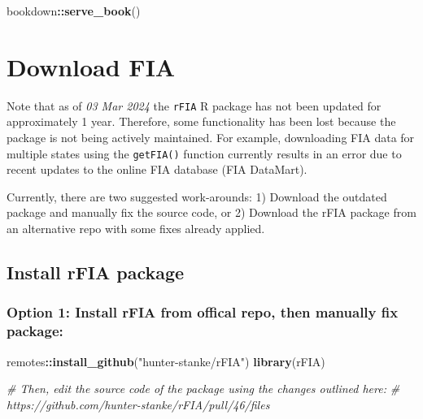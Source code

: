 \documentclass[
]{book}
\newenvironment{Shaded}{\begin{snugshade}}{\end{snugshade}}
\newcommand{\CommentTok}[1]{\textcolor[rgb]{0.56,0.35,0.01}{\textit{#1}}}
\newcommand{\FunctionTok}[1]{\textcolor[rgb]{0.13,0.29,0.53}{\textbf{#1}}}
\newcommand{\NormalTok}[1]{#1}
\newcommand{\SpecialCharTok}[1]{\textcolor[rgb]{0.81,0.36,0.00}{\textbf{#1}}}
\newcommand{\StringTok}[1]{\textcolor[rgb]{0.31,0.60,0.02}{#1}}
\begin{document}
\begin{Shaded}
\begin{Highlighting}[]
\NormalTok{bookdown}\SpecialCharTok{::}\FunctionTok{serve\_book}\NormalTok{()}
\end{Highlighting}
\end{Shaded}

\hypertarget{download}{%
\chapter{Download FIA}\label{download}}

Note that as of \emph{03 Mar 2024} the \texttt{rFIA} R package has not been updated for approximately 1 year. Therefore, some functionality has been lost because the package is not being actively maintained. For example, downloading FIA data for multiple states using the \texttt{getFIA()} function currently results in an error due to recent updates to the online FIA database (FIA DataMart).

Currently, there are two suggested work-arounds: 1) Download the outdated package and manually fix the source code, or 2) Download the rFIA package from an alternative repo with some fixes already applied.

\hypertarget{install-rfia-package}{%
\section{Install rFIA package}\label{install-rfia-package}}

\hypertarget{option-1-install-rfia-from-offical-repo-then-manually-fix-package}{%
\subsection{Option 1: Install rFIA from offical repo, then manually fix package:}\label{option-1-install-rfia-from-offical-repo-then-manually-fix-package}}

\begin{Shaded}
\begin{Highlighting}[]
\NormalTok{remotes}\SpecialCharTok{::}\FunctionTok{install\_github}\NormalTok{(}\StringTok{"hunter{-}stanke/rFIA"}\NormalTok{)}
\FunctionTok{library}\NormalTok{(rFIA)}

\CommentTok{\# Then, edit the source code of the package using the changes outlined here:}
\CommentTok{\# https://github.com/hunter{-}stanke/rFIA/pull/46/files}
\end{Highlighting}
\end{Shaded}
\end{document}
